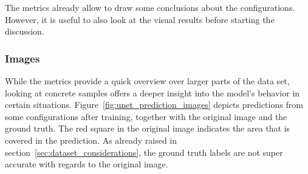 The metrics already allow to draw some conclusions about the configurations. However, it is useful to also look at the visual results before starting the discussion.

\subsubsection{Images}
While the metrics provide a quick overview over larger parts of the data set, looking at concrete samples offers a deeper insight into the model's behavior in certain situations. Figure~\ref{fig:unet_prediction_images} depicts predictions from some configurations after training, together with the original image and the ground truth. The red square in the original image indicates the area that is covered in the prediction. As already raised in section~\ref{sec:dataset_considerations}, the ground truth labels are not super accurate with regards to the original image.

